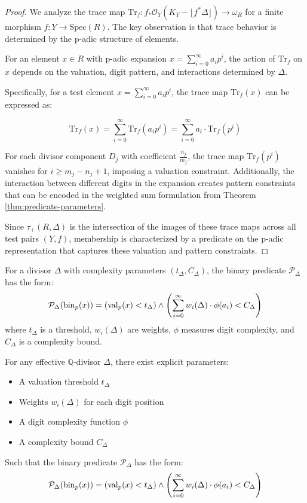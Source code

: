 \begin{proof}
We analyze the trace map $\text{Tr}_f: f_*\mathcal{O}_Y(K_Y - \lfloor f^*\Delta\rfloor) \to \omega_R$ for a finite morphism $f: Y \to \text{Spec}(R)$. The key observation is that trace behavior is determined by the p-adic structure of elements.

For an element $x \in R$ with p-adic expansion $x = \sum_{i=0}^{\infty} a_i p^i$, the action of $\text{Tr}_f$ on $x$ depends on the valuation, digit pattern, and interactions determined by $\Delta$.

Specifically, for a test element $x = \sum_{i=0}^{\infty} a_i p^i$, the trace map $\text{Tr}_f(x)$ can be expressed as:

$$\text{Tr}_f(x) = \sum_{i=0}^{\infty} \text{Tr}_f(a_i p^i) = \sum_{i=0}^{\infty} a_i \cdot \text{Tr}_f(p^i)$$

For each divisor component $D_j$ with coefficient $\frac{n_j}{m_j}$, the trace map $\text{Tr}_f(p^i)$ vanishes for $i \geq m_j - n_j + 1$, imposing a valuation constraint. Additionally, the interaction between different digits in the expansion creates pattern constraints that can be encoded in the weighted sum formulation from Theorem \ref{thm:predicate-parameters}.

Since $\tau_+(R,\Delta)$ is the intersection of the images of these trace maps across all test pairs $(Y,f)$, membership is characterized by a predicate on the p-adic representation that captures these valuation and pattern constraints.
\end{proof}

\begin{definition}\label{def:explicit-predicate}
For a divisor $\Delta$ with complexity parameters $(t_\Delta, C_\Delta)$, the binary predicate $\mathcal{P}_\Delta$ has the form:
$$\mathcal{P}_\Delta(\operatorname{bin}_p(x)) = \left(\operatorname{val}_p(x) < t_\Delta\right) \wedge \left(\sum_{i=0}^{\infty} w_i(\Delta) \cdot \phi(a_i) < C_\Delta\right)$$
where $t_\Delta$ is a threshold, $w_i(\Delta)$ are weights, $\phi$ measures digit complexity, and $C_\Delta$ is a complexity bound.
\end{definition}

\begin{theorem}\label{thm:predicate-parameters}
For any effective $\mathbb{Q}$-divisor $\Delta$, there exist explicit parameters:
\begin{itemize}
    \item A valuation threshold $t_\Delta$
    \item Weights $w_i(\Delta)$ for each digit position
    \item A digit complexity function $\phi$
    \item A complexity bound $C_\Delta$
\end{itemize}

Such that the binary predicate $\mathcal{P}_\Delta$ has the form:
$$\mathcal{P}_\Delta(\operatorname{bin}_p(x)) = \left(\operatorname{val}_p(x) < t_\Delta\right) \wedge \left(\sum_{i=0}^{\infty} w_i(\Delta) \cdot \phi(a_i) < C_\Delta\right)$$
\end{theorem}

